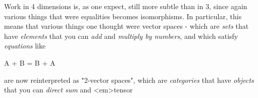 Work in 4 dimensions is, as one expect, still more subtle than in 3,
since again various things that were equalities becomes isomorphisms.
In particular, this means that various things one thought were vector
spaces - which are \emph{sets} 
that have \emph{elements} that you can \emph{add} and
\emph{multiply by numbers}, and which satisfy \emph{equations} 
like 

A + B = B + A

are now reinterpreted as "2-vector spaces", which are
\emph{categories} that have \emph{objects} 
that you can \emph{direct sum} and <em>tensor


